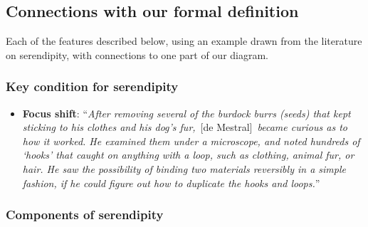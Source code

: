 \subsection{Connections with our formal definition}

Each of the features described below, using an example drawn from the
literature on serendipity, with connections to one part of our diagram.

\subsubsection*{Key condition for serendipity}

\begin{itemize}
\item \textbf{Focus shift}: ``\emph{After removing several of the
  burdock burrs (seeds) that kept sticking to his clothes and his
  dog's fur,}~[de Mestral]~\emph{became curious as to how it
  worked. He examined them under a microscope, and noted hundreds of
  `hooks' that caught on anything with a loop, such as clothing,
  animal fur, or hair. He saw the possibility of binding two materials
  reversibly in a simple fashion, if he could figure out how to
  duplicate the hooks and loops.}''~\cite{wiki:velcro}
%
\end{itemize}

\subsubsection*{Components of serendipity}

